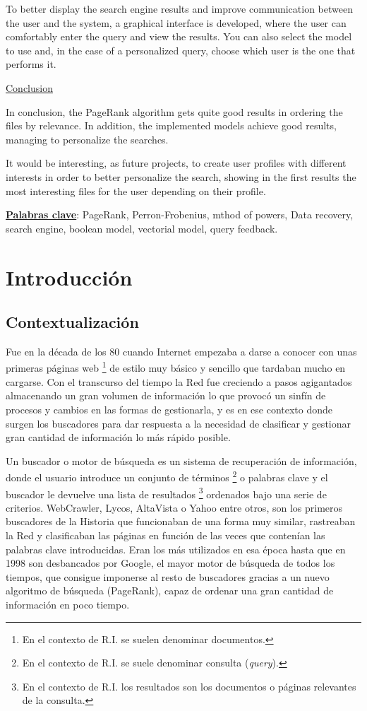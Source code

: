 \documentclass[size=a4, parskip=half, titlepage=false, toc=flat, toc=bib, 12pt, twoside]{scrartcl}
\theoremstyle{theorem-style}
\theoremstyle{definition-style}
\theoremstyle{remark-style}
\theoremstyle{example-style}
\theoremstyle{definition-style}
\theoremstyle{remark-style}
\begin{document}
To better display the search engine results and improve communication between the user and the system, a graphical interface is developed, where the user can comfortably enter the query and view the results. You can also select the model to use and, in the case of a personalized query, choose which user is the one that performs it.

\underline{Conclusion}

In conclusion, the PageRank algorithm gets quite good results in ordering the files by relevance. In addition, the implemented models achieve good results, managing to personalize the searches.

It would be interesting, as future projects, to create user profiles with different interests in order to better personalize the search, showing in the first results the most interesting files for the user depending on their profile.

\textbf{\underline{Palabras clave}}: PageRank, Perron-Frobenius, mthod of powers, Data recovery, search engine, boolean model, vectorial model, query feedback.

\newpage

\section{Introducción}
\subsection{Contextualización}
Fue en la década de los 80 cuando Internet empezaba a darse a conocer con unas primeras páginas web \footnote{En el contexto de R.I. se suelen denominar documentos.} de estilo muy básico y sencillo que tardaban mucho en cargarse. Con el transcurso del tiempo la Red fue creciendo a pasos agigantados almacenando un gran volumen de información lo que provocó  un sinfín de procesos y cambios en las formas de gestionarla, y es en ese contexto donde surgen los buscadores para dar respuesta a la necesidad de clasificar y gestionar gran cantidad de información lo más rápido posible.

Un buscador o motor de búsqueda es un sistema de recuperación de información, donde el usuario introduce un conjunto de términos \footnote{En el contexto de R.I. se suele denominar consulta (\textit{query}).} o palabras clave y el buscador le devuelve una lista de resultados \footnote{En el contexto de R.I. los resultados son los documentos o páginas relevantes de la consulta.} ordenados bajo una serie de criterios. WebCrawler, Lycos, AltaVista o Yahoo entre otros, son los primeros buscadores de la Historia que funcionaban de una forma muy similar, rastreaban la Red y clasificaban las páginas en función de las veces que contenían las palabras clave introducidas. Eran los más utilizados en esa época hasta que en 1998 son desbancados por Google, el mayor motor de búsqueda de todos los tiempos,  que consigue imponerse al resto de buscadores gracias a un nuevo algoritmo de búsqueda (PageRank), capaz de ordenar una gran cantidad de información en poco tiempo.
\end{document}

